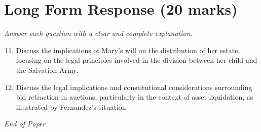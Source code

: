 \documentclass[12pt]{article}
\begin{document}
\section*{Long Form Response (20 marks)}
\textit{Answer each question with a clear and complete explanation.}
\begin{enumerate}[label=\arabic*.]
\setcounter{enumi}{10}
\item Discuss the implications of Mary's will on the distribution of her estate, focusing on the legal principles involved in the division between her child and the Salvation Army.
\item Discuss the legal implications and constitutional considerations surrounding bid retraction in auctions, particularly in the context of asset liquidation, as illustrated by Fernandez's situation.
\end{enumerate}

\vfill
\noindent\textit{End of Paper}
\end{document}

